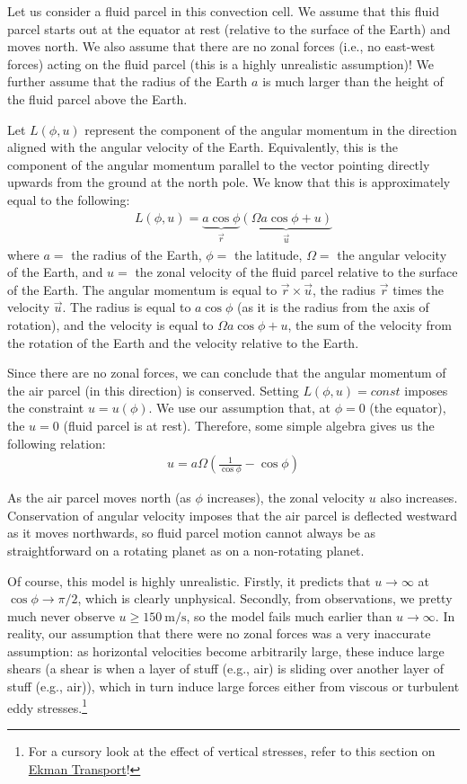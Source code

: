 Let us consider a fluid parcel in this convection cell. We assume that this fluid parcel starts out at the equator at rest (relative to the surface of the Earth) and moves north. We also assume that there are no zonal forces (i.e., no east-west forces) acting on the fluid parcel (this is a highly unrealistic assumption)! We further assume that the radius of the Earth \(a\) is much larger than the height of the fluid parcel above the Earth.

Let \(L(\phi,u)\) represent the component of the angular momentum in the direction aligned with the angular velocity of the Earth. Equivalently, this is the component of the angular momentum parallel to the vector pointing directly upwards from the ground at the north pole. We know that this is approximately equal to the following:
\begin{align*}
    L(\phi,u) = \underbrace{a\cos\phi}_{\vec{r}} \underbrace{\left( \Omega a \cos \phi + u \right)}_{\vec{u}}
\end{align*}
where \(a=\) the radius of the Earth, \(\phi=\) the latitude, \(\Omega=\) the angular velocity of the Earth, and \(u=\) the zonal velocity of the fluid parcel relative to the surface of the Earth. The angular momentum is equal to \(\vec{r}\times\vec{u}\), the radius \(\vec{r}\) times the velocity \(\vec{u}\). The radius is equal to \(a\cos\phi\) (as it is the radius from the axis of rotation), and the velocity is equal to \(\Omega a \cos \phi + u\), the sum of the velocity from the rotation of the Earth and the velocity relative to the Earth.

Since there are no zonal forces, we can conclude that the angular momentum of the air parcel (in this direction) is conserved. Setting \(L(\phi,u)=const\) imposes the constraint \(u=u(\phi)\). We use our assumption that, at \(\phi=0\) (the equator), the \(u=0\) (fluid parcel is at rest). Therefore, some simple algebra gives us the following relation:
\begin{align*}
    \boxed{u=a\Omega \left( \frac{1}{\cos\phi}-\cos\phi
    \right)}
\end{align*}

As the air parcel moves north (as \(\phi\) increases), the zonal velocity \(u\) also increases. Conservation of angular velocity imposes that the air parcel is deflected westward as it moves northwards, so fluid parcel motion cannot always be as straightforward on a rotating planet as on a non-rotating planet.

Of course, this model is highly unrealistic. Firstly, it predicts that \(u\to\infty\) at \(\cos\phi\to\pi/2\), which is clearly unphysical. Secondly, from observations, we pretty much never observe \(u\geq\qty{150}{\metre\per\second}\), so the model fails much earlier than \(u\to\infty\). In reality, our assumption that there were no zonal forces was a very inaccurate assumption: as horizontal velocities become arbitrarily large, these induce large shears (a shear is when a layer of stuff (e.g., air) is sliding over another layer of stuff (e.g., air)), which in turn induce large forces either from viscous or turbulent eddy stresses.\footnote{For a cursory look at the effect of vertical stresses, refer to this section on \hyperref[Ekman Transport]{Ekman Transport}!}

